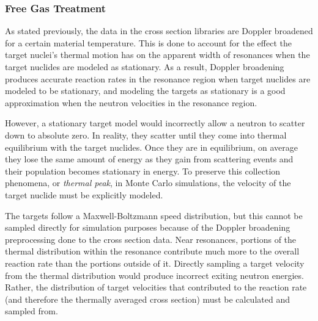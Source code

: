 \subsubsection{Free Gas Treatment}

As stated previously, the data in the cross section libraries are Doppler broadened for a certain material temperature.  This is done to account for the effect the target nuclei's thermal motion has on the apparent width of resonances when the target nuclides are modeled as stationary. As a result, Doppler broadening produces accurate reaction rates in the resonance region when target nuclides are modeled to be stationary, and modeling the targets as stationary is a good approximation when the neutron velocities in the resonance region. 

However, a stationary target model would incorrectly allow a neutron to scatter down to absolute zero.  In reality, they scatter until they come into thermal equilibrium with the target nuclides.  Once they are in equilibrium, on average they lose the same amount of energy as they gain from scattering events and their population becomes stationary in energy.  To preserve this collection phenomena, or \emph{thermal peak}, in Monte Carlo simulations, the velocity of the target nuclide must be explicitly modeled.  


The targets follow a Maxwell-Boltzmann speed distribution, but this cannot be sampled directly for simulation purposes because of the Doppler broadening preprocessing done to the cross section data.  Near resonances, portions of the thermal distribution within the resonance contribute much more to the overall reaction rate than the portions outside of it.  Directly sampling a target velocity from the thermal distribution would produce incorrect exiting neutron energies.  Rather, the distribution of target velocities that contributed to the reaction rate (and therefore the thermally averaged cross section) must be calculated and sampled from.

